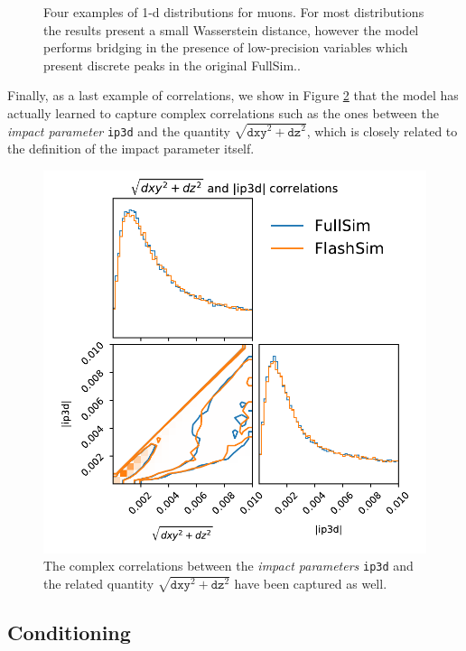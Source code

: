 \begin{figure}
    \caption[1-d muons distributions]{Four examples of 1-d distributions for muons. For most distributions the results present a small Wasserstein distance, however the model performs bridging in the presence of low-precision variables which present discrete peaks in the original FullSim..}\label{fig:muonsdists}
    
\end{figure}

Finally, as a last example of correlations, we show in Figure \ref{fig:corrmuons} that the model has actually learned to capture complex correlations such as the ones between the \emph{impact parameter} \texttt{ip3d} and the quantity $\sqrt{\texttt{dxy}^2 + \texttt{dz}^2}$, which is closely related to the definition of the impact parameter itself.

\begin{figure}
    \centering
    \includegraphics[scale=0.6]{gfx/ch5/mcorrs.pdf}
    \caption[Muons correlations]{The complex correlations between the \emph{impact parameters} \texttt{ip3d} and the related quantity $\sqrt{\texttt{dxy}^2 + \texttt{dz}^2}$ have been captured as well.}
    \label{fig:corrmuons}
\end{figure}


\subsection{Conditioning}

